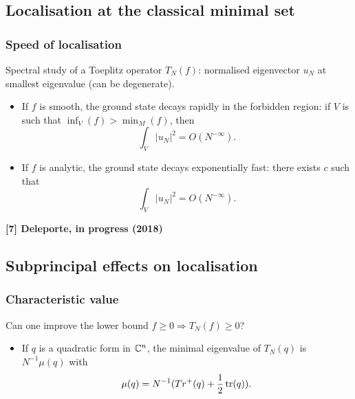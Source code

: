 \documentclass[mathserif]{beamer}
\begin{document}
\subsection{Localisation at the classical minimal set}
\begin{frame}
  \frametitle{Speed of localisation}
  Spectral study of a Toeplitz operator $T_N(f)$: normalised
  eigenvector $u_N$ at smallest eigenvalue (can be degenerate).
  \begin{itemize}
    \item<2->  If $f$ is smooth, the ground state decays
      rapidly in the forbidden region: if $V$ is such that
      $\inf_V(f)>\min_M(f)$, then \[\int_{V}|u_N|^2=O(N^{-\infty}).\]
    \item<3> If $f$ is analytic, the ground state decays exponentially
      fast: there exists $c$ such that
      \[
        \int_{V}|u_N|^2=O(N^{-\infty}).
      \]\vspace{-1em}
    \end{itemize}

\footnotesize{\bfseries{[7] Deleporte, in progress (2018)}}
  \end{frame}

\subsection{Subprincipal effects on localisation}
\begin{frame}
  \frametitle{Characteristic value}
  Can one improve the lower bound $f\geq 0\Rightarrow T_N(f)\geq 0$?
  \begin{itemize}
  \item If $q$ is a quadratic form in $\mathbb{C}^n$, the minimal eigenvalue
    of $T_N(q)$ is $N^{-1}\mu(q)$ with $$\mu(q)=N^{-1}(Tr^+(q)+\frac
    12 \operatorname{tr}(q)).$$

\end{itemize}
\end{frame}
\end{document}
